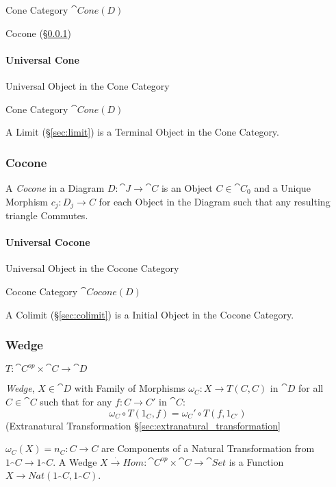 Cone Category $\cat{Cone}(D)$

Cocone (\S\ref{sec:cocone})



\paragraph{Universal Cone}\label{sec:universal_cone}\hfill

Universal Object in the Cone Category

Cone Category $\cat{Cone}(D)$

A Limit (\S\ref{sec:limit}) is a Terminal Object in the Cone
Category.



\subsubsection{Cocone}\label{sec:cocone}

A \emph{Cocone} in a Diagram $D : \cat{J} \rightarrow \cat{C}$
is an Object $C \in \cat{C}_0$ and a Unique Morphism $c_j : D_j
\rightarrow C$ for each Object in the Diagram such that any resulting
triangle Commutes.




\paragraph{Universal Cocone}\label{sec:universal_cocone}\hfill

Universal Object in the Cocone Category

Cocone Category $\cat{Cocone}(D)$

A Colimit (\S\ref{sec:colimit}) is a Initial Object in the Cocone
Category.



\subsubsection{Wedge}\label{sec:wedge}

$T : \cat{C}^{op} \times \cat{C} \rightarrow \cat{D}$

\emph{Wedge}, $X \in \cat{D}$ with Family of Morphisms $\omega_C :
X \rightarrow T(C,C)$ in $\cat{D}$ for all $C \in \cat{C}$ such
that for any $f : C \rightarrow C'$ in $\cat{C}$:
\[
  \omega_C \circ T(1_C,f) = \omega_C' \circ T(f,1_{C'})
\]
(Extranatural Transformation \S\ref{sec:extranatural_transformation}

$\omega_C(X) = n_C : C \rightarrow C$ are Components of a Natural
Transformation from $1_\cat{C} \rightarrow 1_\cat{C}$. A Wedge
$X \xrightarrow{.} Hom : \cat{C}^{op} \times \cat{C} \rightarrow
\cat{Set}$ is a Function $X \rightarrow Nat
(1_\cat{C},1_\cat{C})$.

